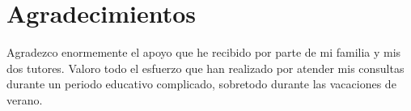 

\chapter{Agradecimientos}

Agradezco enormemente el apoyo que he recibido por parte de mi familia y mis dos tutores. Valoro todo el esfuerzo que han realizado por atender mis consultas durante un periodo educativo complicado, sobretodo durante las vacaciones de verano.

\cleardoublepage
\endinput
